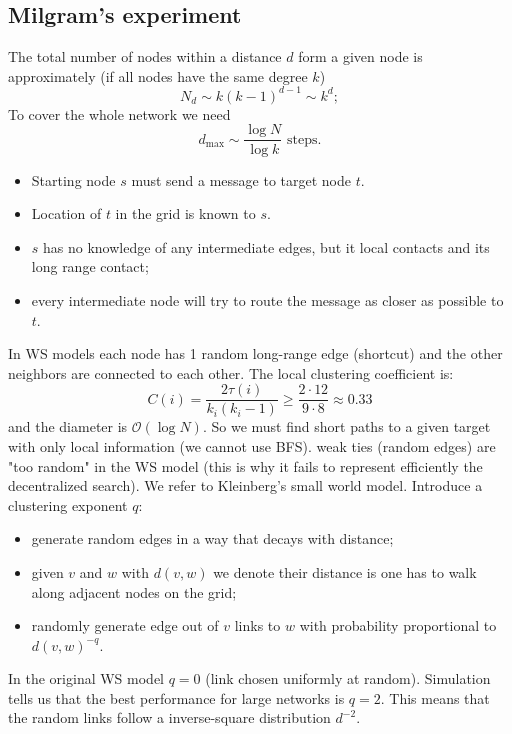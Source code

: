 \documentclass[a4paper,9pt]{extarticle}
\begin{document}
\begin{multicols*}{2}
		\subsection{Milgram's experiment}
		The total number of nodes within a distance $d$ form a given node is approximately (if all nodes have the same degree $k$)
		\begin{equation*}
			N_{d}\sim k(k-1)^{d-1}\sim k^{d};
		\end{equation*}
		To cover the whole network we need
		\begin{equation*}
			d_{\max}\sim\frac{\log N}{\log k}\text{ steps}.
		\end{equation*}
		\begin{riquadro}
			\begin{itemize}
				\item Starting node $s$ must send a message to target node $t$.
				\item Location of $t$ in the grid is known to $s$.
				\item $s$ has no knowledge of any intermediate edges, but it local contacts and its long range contact;
				\item every intermediate node will try to route the message as closer as possible to $t$.
			\end{itemize}
		\end{riquadro}
		In WS models each node has 1 random long-range edge (shortcut) and the other neighbors are connected to each other. The local clustering coefficient is:
		\begin{equation*}
			C(i)=\frac{2\tau(i)}{k_{i}\left(k_{i}-1\right)}\geq\frac{2\cdot12}{9\cdot8}\approx0.33
		\end{equation*}
		and the diameter is $\mathcal{O}(\log N)$. So we must find short paths to a given target with only local information (we cannot use BFS). weak ties (random edges) are "too random" in the WS model (this is why it fails to
		represent efficiently the decentralized search). We refer to Kleinberg's small world model. Introduce a clustering exponent $q$:
		\begin{itemize}
			\item generate random edges in a way that decays with distance;
			\item given $v$ and $w$ with $d(v,w)$ we denote their distance is one has to walk along adjacent nodes on the grid;
			\item randomly generate edge out of $v$ links to $w$ with probability proportional to $d(v,w)^{-q}$.
		\end{itemize}
		In the original WS model $q=0$ (link chosen uniformly at random). Simulation tells us that the best performance for large networks is $q=2$. This means that the random links follow a inverse-square distribution $d^{-2}$.

\end{multicols*}
\end{document}
